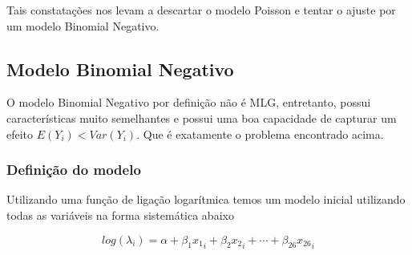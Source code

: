 \documentclass[12pt,a4paper]{article}\usepackage[]{graphicx}\usepackage[]{color}
\begin{document}
Tais constatações nos levam a descartar o modelo Poisson e tentar o ajuste por um modelo Binomial Negativo.


\subsection{\textbf{Modelo Binomial Negativo}}
O modelo Binomial Negativo por definição não é MLG, entretanto, possui características muito semelhantes e possui uma boa capacidade de capturar um efeito $E(Y_i)<Var(Y_i)$. Que é exatamente o problema encontrado acima.
\subsubsection{\textbf{Definição do modelo}}
Utilizando uma função de ligação logarítmica temos um modelo inicial utilizando todas as variáveis na forma sistemática abaixo

$$log(\lambda_i)=\alpha+\beta_1{x_1}_i+\beta_2{x_2}_i+\cdots+\beta_{26}{x_{26}}_i$$
\end{document}
